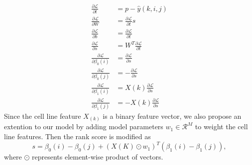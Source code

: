 \begin{align*}
\frac{\partial \mathcal{L}}{\partial t} &= p - \hat{y}(k,i,j) \\
\frac{\partial \mathcal{L}}{\partial W} &= \frac{\partial \mathcal{L}}{\partial t} s\\
\frac{\partial \mathcal{L}}{\partial b} &= \frac{\partial \mathcal{L}}{\partial t} \\
\frac{\partial \mathcal{L}}{\partial s} &= W^T \frac{\partial \mathcal{L}}{\partial t} \\
\frac{\partial \mathcal{L}}{\partial \beta_0(i)} &= \frac{\partial \mathcal{L}}{\partial s} \\
\frac{\partial \mathcal{L}}{\partial \beta_0(j)} &= -\frac{\partial \mathcal{L}}{\partial s} \\
\frac{\partial \mathcal{L}}{\partial \beta_1(i)} &=  X(k) \frac{\partial \mathcal{L}}{\partial s} \\
\frac{\partial \mathcal{L}}{\partial \beta_1(j)} &=  -X(k) \frac{\partial \mathcal{L}}{\partial s}
\end{align*}
Since the cell line feature $X_(k)$ is a binary feature vector, we also propose an extention to our model by adding model parameters $w_1 \in \mathcal{R}^ M$ to weight the cell line features. Then the rank score is modified as 
\begin{equation}
s = \beta_0(i) - \beta_0(j) + (X(K) \odot w_1)^T (\beta_1(i) - \beta_1(j)),
\end{equation}
where $\odot$ represents element-wise product of vectors.
